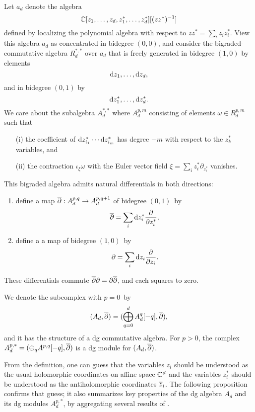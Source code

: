 \begin{dfn}
Let $a_d$ denote the algebra  
\[
\mathbb C[z_1,\ldots,z_d, z_1^*,\ldots,z_d^*][(z z^*)^{-1}]
\]
defined by localizing the polynomial algebra with respect to $zz^* = \sum_i z_i z^*_i$.
View this algebra $a_d$ as concentrated in bidegree $(0,0)$, 
and consider the bigraded-commutative algebra $R^{*,*}_d$ over $a_d$ that is freely generated in bidegree $(1,0)$ by elements
\[
{\rm d} z_1,\ldots , {\rm d} z_d,
\] 
and in bidegree $(0,1)$ by
\[
{\rm d} z_1^*,\ldots, {\rm d} z_d^*.
\]
We care about the subalgebra $A^{*,*}_d$ where $A^{p,m}_d$ consisting of elements $\omega \in R^{p,m}_d$ such that
\begin{itemize}
\item[(i)] the coefficient of ${\rm d} z^*_{i_1} \cdots {\rm d} z^*_{i_m}$ has degree $-m$ with respect to the $z_k^*$ variables, and
\item[(ii)] the contraction $\iota_\xi \omega$ with the Euler vector field $\xi = \sum_{i} z_i^* \partial_{z_{i}^*}$ vanishes.
\end{itemize}
This bigraded algebra admits natural differentials in both directions:
\begin{enumerate}
\item define a map $\overline{\partial} : A_d^{p,q} \to A_d^{p,q+1}$ of bidegree $(0,1)$~by
\[
\overline{\partial} = \sum_i {\rm d} z^*_i \frac{\partial}{\partial z_i^*},
\]
\item define a a map of bidegree $(1,0)$~by
\[
\partial = \sum_i {\rm d} z_i \frac{\partial}{\partial z_i} .
\]
\end{enumerate}
These differentials commute $\overline{\partial} \partial = \partial \overline{\partial}$,
and each squares to zero.
\end{dfn}

We denote the subcomplex with $p=0$~by 
\[
(A_d, \overline{\partial}) = (\bigoplus_{q = 0}^d A_d^{q}[-q], \overline{\partial}),
\] 
and it has the structure of a dg commutative algebra.
For $p>0$, the complex $A^{p,*}_d = (\oplus_q A^{p,q}[-q], \overline{\partial})$ is a dg module for $(A_d, \overline{\partial})$.

From the definition, one can guess that the variables $z_i$ should be understood as the usual holomorphic coordinates on affine space $\mathbb C^d$ and the variables $z^*_i$ should be understood as the antiholomorphic coordinates $\overline{z}_i$.
The following proposition confirms that guess;
it also summarizes key properties of the dg algebra $A_d$ and its dg modules $A_{d}^{p,*}$,
by aggregating several results of \cite{FHK}.

